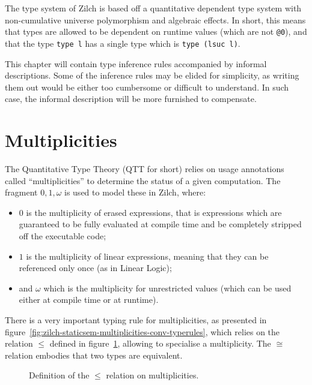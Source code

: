 The type system of Zilch is based off a quantitative dependent type system with non-cumulative universe polymorphism and algebraic effects.
In short, this means that types are allowed to be dependent on runtime values (which are not \texttt{@0}), and that the type \texttt{type l} has a single type which is \texttt{type (lsuc l)}.

This chapter will contain type inference rules accompanied by informal descriptions.
Some of the inference rules may be elided for simplicity, as writing them out would be either too cumbersome or difficult to understand.
In such case, the informal description will be more furnished to compensate.

\section{Multiplicities}\label{sec:zilch-staticsem-multiplicities}

The Quantitative Type Theory (QTT for short) relies on usage annotations called ``multiplicities'' to determine the status of a given computation.
The fragment $0,1,\omega$ is used to model these in Zilch, where:
\begin{itemize}
	\item $0$ is the multiplicity of erased expressions, that is expressions which are guaranteed to be fully evaluated at compile time and be completely stripped off the executable code;
	\item $1$ is the multiplicity of linear expressions, meaning that they can be referenced only once (as in Linear Logic);
	\item and $\omega$ which is the multiplicity for unrestricted values (which can be used either at compile time or at runtime).
\end{itemize}

There is a very important typing rule for multiplicities, as presented in figure~\ref{fig:zilch-staticsem-multiplicities-conv-typerules}, which relies on the relation $\leqslant$ defined in figure~\ref{fig:zilch-staticsem-multiplicities-partialorder}, allowing to specialise a multiplicity.
The $\cong$ relation embodies that two types are equivalent.

\begin{figure}[H]

	\caption{Definition of the $\leqslant$ relation on multiplicities.}
	\label{fig:zilch-staticsem-multiplicities-partialorder}
\end{figure}

